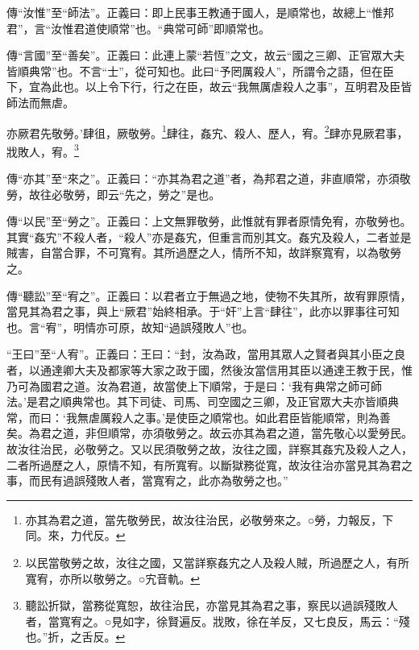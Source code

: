 {\noindent\zhuan{}\fzbyks 傳“汝惟”至“師法”。正義曰：即上民事王教通于國人，是順常也，故總上“惟邦君”，言“汝惟君道使順常”也。“典常可師”即順常也。 \par}

{\noindent\zhuan{}\fzbyks 傳“言國”至“善矣”。正義曰：此連上蒙“若恆”之文，故云“國之三卿、正官眾大夫皆順典常”也。不言“士”，從可知也。此曰“予罔厲殺人”，所謂令之語，但在臣下，宜為此也。以上令下行，行之在臣，故云“我無厲虐殺人之事”，互明君及臣皆師法而無虐。 \par}

亦厥君先敬勞。’肆徂，厥敬勞。\footnote{亦其為君之道，當先敬勞民，故汝往治民，必敬勞來之。○勞，力報反，下同。來，力代反。}肆往，姦宄、殺人、歷人，宥。\footnote{以民當敬勞之故，汝往之國，又當詳察姦宄之人及殺人賊，所過歷之人，有所寬宥，亦所以敬勞之。○宄音軌。}肆亦見厥君事，戕敗人，宥。\footnote{聽訟折獄，當務從寬恕，故往治民，亦當見其為君之事，察民以過誤殘敗人者，當寬宥之。○見如字，徐賢遍反。戕敗，徐在羊反，又七良反，馬云：“殘也。”折，之舌反。}

{\noindent\zhuan{}\fzbyks 傳“亦其”至“來之”。正義曰：“亦其為君之道”者，為邦君之道，非直順常，亦須敬勞，故往必敬勞，即云“先之，勞之”是也。 \par}

{\noindent\zhuan{}\fzbyks 傳“以民”至“勞之”。正義曰：上文無罪敬勞，此惟就有罪者原情免宥，亦敬勞也。其實“姦宄”不殺人者，“殺人”亦是姦宄，但重言而別其文。姦宄及殺人，二者並是賊害，自當合罪，不可寬宥。其所過歷之人，情所不知，故詳察寬宥，以為敬勞之。 \par}

{\noindent\zhuan{}\fzbyks 傳“聽訟”至“宥之”。正義曰：以君者立于無過之地，使物不失其所，故宥罪原情，當見其為君之事，與上“厥君”始終相承。于“奸”上言“肆往”，此亦以罪事往可知也。言“宥”，明情亦可原，故知“過誤殘敗人”也。 \par}

{\noindent\shu{}\fzkt “王曰”至“人宥”。正義曰：王曰：“封，汝為政，當用其眾人之賢者與其小臣之良者，以通達卿大夫及都家等大家之政于國，然後汝當信用其臣以通達王教于民，惟乃可為國君之道。汝為君道，故當使上下順常，于是曰：‘我有典常之師可師法。’是君之順典常也。其下司徒、司馬、司空國之三卿，及正官眾大夫亦皆順典常，而曰：‘我無虐厲殺人之事。’是使臣之順常也。如此君臣皆能順常，則為善矣。為君之道，非但順常，亦須敬勞之。故云亦其為君之道，當先敬心以愛勞民。故汝往治民，必敬勞之。又以民須敬勞之故，汝往之國，詳察其姦宄及殺人之人，二者所過歷之人，原情不知，有所寬宥。以斷獄務從寬，故汝往治亦當見其為君之事，而民有過誤殘敗人者，當寬宥之，此亦為敬勞之也。” \par}

